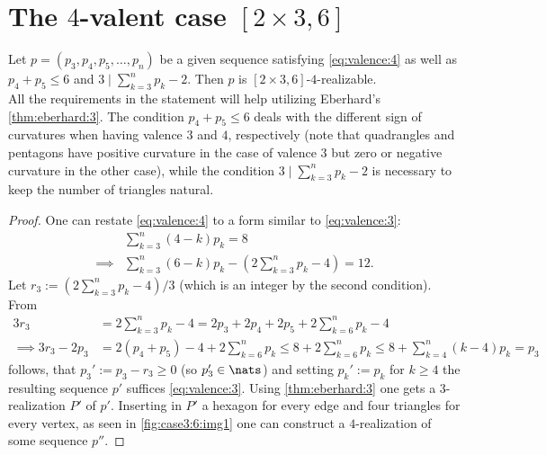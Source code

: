 \section{The $4$-valent case $[2 \times 3, 6]$}
\begin{lemma}\label{thm:case3:6:mainlemma}
  Let $p = (p_3, p_4, p_5, \dots, p_n)$ be a given sequence satisfying \autoref{eq:valence:4} as well as $p_4 + p_5 \leq 6$ and $3 \mid \sum_{k=3}^{n} p_k - 2$. Then $p$ is $[2 \times 3, 6]$-$4$-realizable.\\

  All the requirements in the statement will help utilizing Eberhard's \autoref{thm:eberhard:3}. The condition $p_4 + p_5 \leq 6$ deals with the different sign of curvatures when having valence $3$ and $4$, respectively (note that quadrangles and pentagons have positive curvature in the case of valence $3$ but zero or negative curvature in the other case), while the condition $3 \mid \sum_{k=3}^{n} p_k - 2$ is necessary to keep the number of triangles natural.
  \begin{proof}
    One can restate \autoref{eq:valence:4} to a form similar to \autoref{eq:valence:3}:
    \begin{align*}
      & \sum_{k=3}^n \left( 4 - k \right) p_k = 8 \\
      \implies & \sum_{k=3}^n \left( 6 - k \right) p_k - \left(2 \sum_{k=3}^n  p_k - 4 \right) = 12.
    \end{align*}
    Let $r_3 := (2 \sum_{k=3}^{n} p_k - 4)/3$ (which is an integer by the second condition). From
    \begin{align*}
      3 r_3 &= 2 \sum_{k=3}^{n} p_k - 4 =  2 p_3 + 2 p_4 + 2 p_5 + 2 \sum_{k=6}^{n} p_k - 4\\
      \implies 3 r_3 - 2 p_3 &= 2(p_4 + p_5) - 4 + 2 \sum_{k=6}^{n} p_k \leq 8 + 2 \sum_{k=6}^{n} p_k \leq 8 + \sum_{k=4}^{n} (k - 4) p_k = p_3
    \end{align*}
    follows, that $p_3' := p_3 - r_3 \geq 0$ (so $p'_3 \in \nats$) and setting $p_k' := p_k$ for $k \geq 4$ the resulting sequence $p'$ suffices \autoref{eq:valence:3}. Using \autoref{thm:eberhard:3} one gets a $3$-realization $P'$ of $p'$. Inserting in $P'$ a hexagon for every edge and four triangles for every vertex, as seen in \autoref{fig:case3:6:img1} one can construct a $4$-realization of some sequence $p''$.


\end{proof}
\end{lemma}
